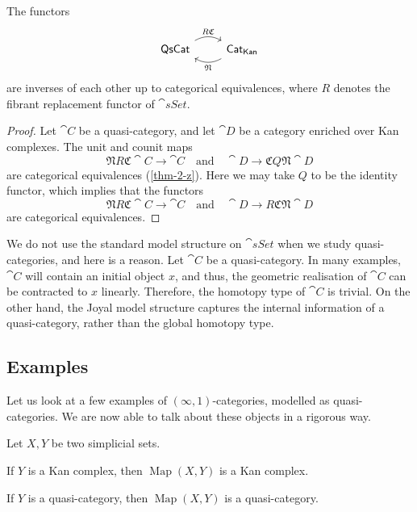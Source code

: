 \begin{corollary}
    The functors 
    \[\begin{tikzcd}
        \cat{QsCat}\ar[r,bend left,start anchor=north east,end anchor=north west,"R\mathfrak C"] &
        \cat{Cat}_{\cat{Kan}}\ar[l,bend left,start anchor=south west,end anchor=south east,"\mathfrak N"]
    \end{tikzcd}\]
    are inverses of each other up to categorical equivalences,
    where $R$ denotes the fibrant replacement functor of $\cat{sSet}$.
\end{corollary}

\begin{proof}
    Let $\cat C$ be a quasi-category, and let $\cat D$ be a category 
    enriched over Kan complexes. The unit and counit maps
    \[ \mathfrak NR\mathfrak C\cat C\to\cat C\quad\text{and}\quad\cat D\to\mathfrak CQ\mathfrak N\cat D \]
    are categorical equivalences (\ref{thm-2-z}).
    Here we may take $Q$ to be the identity functor, 
    which implies that the functors
    \[ \mathfrak NR\mathfrak C\cat C\to\cat C\quad\text{and}\quad\cat D\to R\mathfrak C\mathfrak N\cat D \]
    are categorical equivalences.
\end{proof}

\begin{remark}
    We do not use the standard model structure on $\cat{sSet}$
    when we study quasi-categories, and here is a reason.
    Let $\cat C$ be a quasi-category.
    In many examples, $\cat C$ will contain an initial object $x$,
    and thus, the geometric realisation of $\cat C$ 
    can be contracted to $x$ linearly.
    Therefore, the homotopy type of $\cat C$ is trivial.
    On the other hand, the Joyal model structure 
    captures the internal information of a quasi-category,
    rather than the global homotopy type. \varqed
\end{remark}

\subsection{Examples}

Let us look at a few examples of $(\infty,1)$-categories,
modelled as quasi-categories.
We are now able to talk about these objects in a rigorous way.

\begin{proposition}\label{thm-4-x}
    Let $X,Y$ be two simplicial sets.
    \begin{itms}
        \item If $Y$ is a Kan complex,
        then $\operatorname{Map}(X,Y)$ is a Kan complex.
        \item If $Y$ is a quasi-category,
        then $\operatorname{Map}(X,Y)$ is a quasi-category.
    \end{itms}
\end{proposition}

